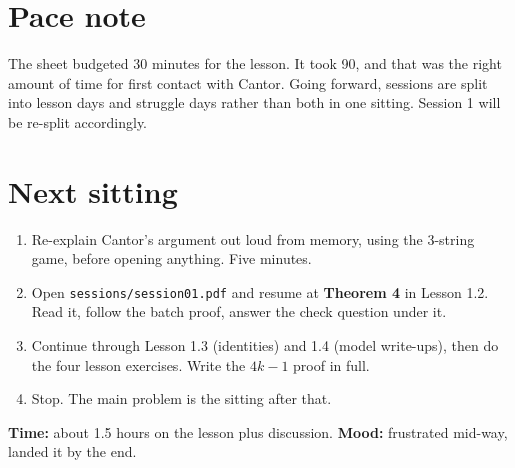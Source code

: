 \documentclass[11pt]{article}
\begin{document}
\section*{Pace note}
The sheet budgeted 30 minutes for the lesson. It took 90, and that was the right amount of time for first contact with Cantor. Going forward, sessions are split into lesson days and struggle days rather than both in one sitting. Session 1 will be re-split accordingly.

\section*{Next sitting}
\begin{enumerate}
  \item Re-explain Cantor's argument out loud from memory, using the 3-string game, before opening anything. Five minutes.
  \item Open \texttt{sessions/session01.pdf} and resume at \textbf{Theorem 4} in Lesson 1.2. Read it, follow the batch proof, answer the check question under it.
  \item Continue through Lesson 1.3 (identities) and 1.4 (model write-ups), then do the four lesson exercises. Write the $4k-1$ proof in full.
  \item Stop. The main problem is the sitting after that.
\end{enumerate}

\bigskip
\noindent\textbf{Time:} about 1.5 hours on the lesson plus discussion. \quad \textbf{Mood:} frustrated mid-way, landed it by the end.
\end{document}
